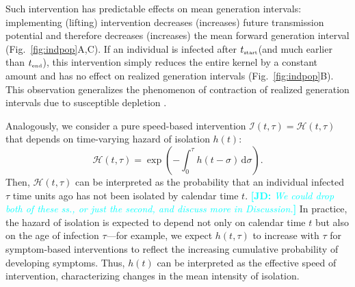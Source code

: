 \documentclass[12pt]{article}
\newcommand{\comment}{\showcomment}
\newcommand{\showcomment}[3]{\textcolor{#1}{\textbf{[#2: }\textsl{#3}\textbf{]}}}
\newcommand{\jd}[1]{\comment{cyan}{JD}{#1}}
\newcommand{\fref}[1]{Fig.~\ref{fig:#1}}
\newcommand{\tsub}[2]{#1_{{\textrm{\tiny #2}}}}
\newcommand{\dd}[1]{\ensuremath{\, \mathrm{d}#1}}
\newcommand{\dsigma}{\dd{\sigma}}
\newcommand{\tstart}{\ensuremath{\tsub{t}{start}}\xspace}
\newcommand{\tend}{\ensuremath{\tsub{t}{end}}\xspace}
\newcommand{\II}{\ensuremath{\mathcal I}}
\newcommand{\HH}{\ensuremath{\mathcal H}}
\begin{document}
Such intervention has predictable effects on mean generation intervals:
implementing (lifting) intervention decreases (increases) future transmission potential and therefore decreases (increases) the mean forward generation interval (\fref{indpop}A,C).
If an individual is infected after \tstart (and much earlier than \tend), this intervention simply reduces the entire kernel by a constant amount and has no effect on realized generation intervals (\fref{indpop}B).
This observation generalizes the phenomenon of contraction of realized generation intervals due to susceptible depletion \citep{kenah2008generation,nishiura2010time,champredon2015intrinsic}.

Analogously, we consider a pure speed-based intervention $\II(t, \tau) = \HH(t, \tau)$ that depends on time-varying hazard of isolation $h(t)$:
\begin{equation}
\HH(t, \tau) = \exp \left(- \int_0^\tau h(t-\sigma) \dsigma \right).
\end{equation}
Then, $\HH(t,\tau)$ can be interpreted as the probability that an individual infected $\tau$ time units ago has not been isolated by calendar time $t$.
\jd{We could drop both of these ss., or just the second, and discuss more in Discussion.}
In practice, the hazard of isolation is expected to depend not only on calendar time $t$ but also on the age of infection $\tau$---for example, we expect $h(t, \tau)$ to increase with $\tau$ for symptom-based interventions to reflect the increasing cumulative probability of developing symptoms.
Thus, $h(t)$ can be interpreted as the effective speed of intervention, characterizing changes in the mean intensity of isolation.
\end{document}
